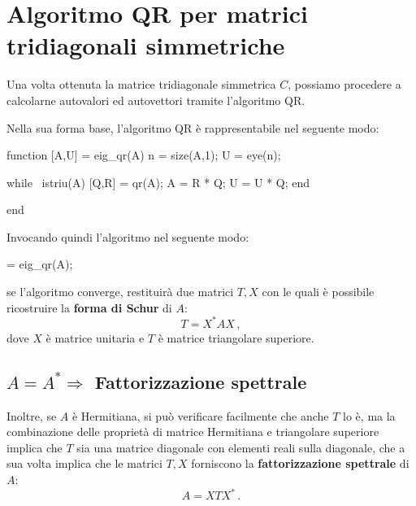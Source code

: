 \section{Algoritmo QR per matrici tridiagonali simmetriche}
Una volta ottenuta la matrice tridiagonale simmetrica $C$, possiamo procedere a 
calcolarne autovalori ed autovettori tramite l'algoritmo QR.

Nella sua forma base, l'algoritmo QR è rappresentabile nel seguente modo:

\vspace{10pt}
\begin{minipage}[c][0.3\textheight][t]{0.34\textwidth}
\begin{programma}
function [A,U] = eig_qr(A)
n = size(A,1);
U = eye(n);

while ~istriu(A)
	[Q,R] = qr(A);
	A = R * Q;
	U = U * Q;
end

end
\end{programma}
\end{minipage}
\hfill
{}


Invocando quindi l'algoritmo nel seguente modo:
\begin{programma}
	[T,X] = eig_qr(A);
\end{programma}
se l'algoritmo converge, restituirà due matrici $T,X$ con le quali è possibile 
ricostruire la \textbf{forma di Schur} di $A$:
\begin{equation*}
	T = X^* A X \,,
\end{equation*}
dove $X$ è matrice unitaria e $T$ è matrice triangolare superiore. 

\subsection{$A = A^* \Rightarrow $ Fattorizzazione spettrale}
Inoltre, se $A$ è Hermitiana, si può verificare facilmente che anche $T$ lo è, 
ma la combinazione delle proprietà di matrice Hermitiana e triangolare superiore 
implica che $T$ sia una matrice diagonale con elementi reali sulla diagonale, 
che a sua volta implica che le matrici $T,X$ forniscono la 
\textbf{fattorizzazione spettrale} di $A$:
\begin{equation*}
	A = X T X^* \,.
\end{equation*}

